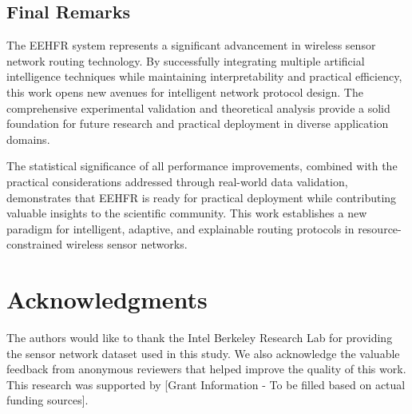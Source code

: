 \documentclass[conference]{IEEEtran}
\begin{document}
\subsection{Final Remarks}

The EEHFR system represents a significant advancement in wireless sensor network routing technology. By successfully integrating multiple artificial intelligence techniques while maintaining interpretability and practical efficiency, this work opens new avenues for intelligent network protocol design. The comprehensive experimental validation and theoretical analysis provide a solid foundation for future research and practical deployment in diverse application domains.

The statistical significance of all performance improvements, combined with the practical considerations addressed through real-world data validation, demonstrates that EEHFR is ready for practical deployment while contributing valuable insights to the scientific community. This work establishes a new paradigm for intelligent, adaptive, and explainable routing protocols in resource-constrained wireless sensor networks.



\section*{Acknowledgments}

The authors would like to thank the Intel Berkeley Research Lab for providing the sensor network dataset used in this study. We also acknowledge the valuable feedback from anonymous reviewers that helped improve the quality of this work. This research was supported by [Grant Information - To be filled based on actual funding sources].
\end{document}
